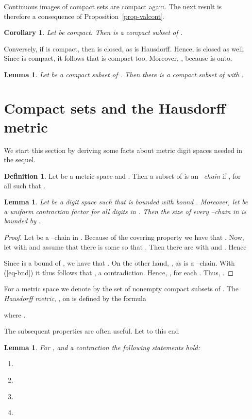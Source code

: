 \documentclass[microtype]{jloganal}
\theoremstyle{plain}
\newtheorem{lemma}[theorem]{Lemma}
\newtheorem{corollary}[theorem]{Corollary}
\theoremstyle{definition}
\newtheorem{definition}[theorem]{Definition}
\begin{document}
Continuous images of compact sets are compact again. The next result is therefore a consequence of Proposition~\ref{prop-valcont}.
\begin{corollary}\label{cor-cant-x}
Let  be compact. Then  is a compact subset of .
\end{corollary}

Conversely, if  is compact, then  is closed, as  is Hausdorff. Hence,  is closed as well. Since  is compact, it follows that  is compact too. Moreover, , because  is onto.
\begin{lemma}\label{lem-x-cant}
Let  be a compact subset of  . Then there is a compact subset  of  with .
\end{lemma}


\section{Compact sets and the Hausdorff metric}
\label{sec-compact-hausdorff}

We start this section by deriving some facts about metric digit spaces 
needed in the sequel.

\begin{definition}
Let  be a metric space and . 
Then a subset  of  is an \emph{--chain} if 
, for all  such that .
\end{definition}

\begin{lemma}\label{lem-cbnd}
Let  be a digit space such that  is bounded with bound . 
Moreover, let  be a uniform contraction factor for all digits in . 
Then the size of every --chain in  is bounded by . 
\end{lemma}
\begin{proof}
Let  be a --chain in . Because of the covering property 
we have that . Now, 
let  with  and assume that there is some 
 so that . Then there are  
with  and . Hence


Since  is a bound of , we have that . On the other 
hand, , as  is a --chain. With 
(\ref{eq-bnd}) it thus follows that , a 
contradiction. Hence, , for each 
. Thus, . 
\end{proof}

For a metric space  we denote by  the set of 
nonempty compact subsets of . The \emph{Hausdorff metric}, , 
on  is defined by the formula

where 
. 

The subsequent properties are often useful. Let to this end

\begin{lemma}\label{lem-hausm}
For ,  and a contraction  the following statements hold:
\begin{enumerate}

\item\label{lem-hausm-1} 

\item\label{lem-hausm-2} 

\item\label{lem-hausm-3} 

\item\label{lem-hausm-4} 

\end{enumerate}
\end{lemma}
\end{document}
